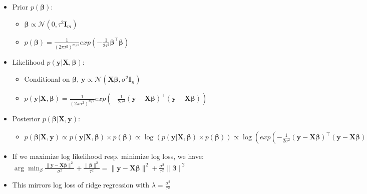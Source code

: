 \begin{itemize}
    \item Prior $p( \boldsymbol{\beta} )$: 
    \begin{itemize}
        \item $\boldsymbol{\beta} \propto \mathcal{N}(0, \tau^2 \boldsymbol{I}_m)$
        \item $p( \boldsymbol{\beta} ) = \frac{ 1 }{ (2\pi\tau^2)^{m/2}} exp ( -\frac{1}{2\tau^2} \boldsymbol{\beta}^\intercal \boldsymbol{\beta} ) $
    \end{itemize}
    \item Likelihood $p( \boldsymbol{y} | \boldsymbol{X}, \boldsymbol{\beta} )$: 
    \begin{itemize}
        \item Conditional on $\boldsymbol{\beta}$, $\boldsymbol{y} \propto \mathcal{N}(\boldsymbol{X} \boldsymbol{\beta}, \sigma^2 \boldsymbol{I}_n)$
        \item $p( \boldsymbol{y} | \boldsymbol{X}, \boldsymbol{\beta} ) = \frac{ 1 }{ (2\pi\sigma^2)^{n/2}} exp ( -\frac{1}{2\sigma^2} (\boldsymbol{y} - \boldsymbol{X} \boldsymbol{\beta})^\intercal (\boldsymbol{y} - \boldsymbol{X} \boldsymbol{\beta}) ) $
    \end{itemize}
    \item Posterior $p( \boldsymbol{\beta} | \boldsymbol{X}, \boldsymbol{y} )$: 
    \begin{itemize}
        \item $p( \boldsymbol{\beta} | \boldsymbol{X}, \boldsymbol{y} ) \propto p ( \boldsymbol{y} |\boldsymbol{X}, \boldsymbol{\beta} ) \times p( \boldsymbol{\beta} ) \propto \log (p ( \boldsymbol{y} |\boldsymbol{X}, \boldsymbol{\beta} ) \times p( \boldsymbol{\beta} )) \propto \log (exp ( -\frac{1}{2\sigma^2} (\boldsymbol{y} - \boldsymbol{X} \boldsymbol{\beta})^\intercal (\boldsymbol{y} - \boldsymbol{X} \boldsymbol{\beta}) ) \times exp( -\frac{1}{2T^2} \boldsymbol{\beta}^\intercal \boldsymbol{\beta} )) \propto -\frac{\|\boldsymbol{y} - \boldsymbol{X} \boldsymbol{\beta} \|^2}{\sigma^2} - \frac{\|\boldsymbol{\beta} \|^2}{\tau^2}$
    \end{itemize}
    \item If we maximize log likelihood resp. minimize log loss, we have: $\arg\min_{\beta} \frac{\|\boldsymbol{y} - \boldsymbol{X} \boldsymbol{\beta} \|^2}{\sigma^2} + \frac{\|\boldsymbol{\beta} \|^2}{\tau^2} = \|\boldsymbol{y} - \boldsymbol{X} \boldsymbol{\beta} \|^2 + \frac{\sigma^2}{\tau^2}\|\boldsymbol{\beta} \|^2$
    \item This mirrors log loss of ridge regression with $\lambda = \frac{\sigma^2}{\tau^2}$
\end{itemize}
